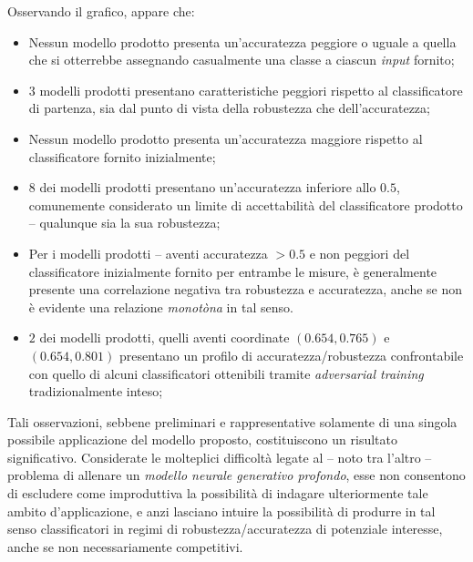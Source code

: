 \documentclass[a4paper, twoside]{article}
\begin{document}
Osservando il grafico, appare che:

\begin{itemize}
	\item {Nessun modello prodotto presenta un'accuratezza peggiore o uguale a quella che si otterrebbe assegnando casualmente una classe a ciascun \textit{input} fornito;}

	\item {$3$ modelli prodotti presentano caratteristiche peggiori rispetto al classificatore di partenza, sia dal punto di vista della robustezza che dell'accuratezza;}

	\item {Nessun modello prodotto presenta un'accuratezza maggiore rispetto al classificatore fornito inizialmente;}

	\item {8 dei modelli prodotti presentano un'accuratezza inferiore allo $0.5$, comunemente considerato un limite di accettabilità del classificatore prodotto -- qualunque sia la sua robustezza;}

	\item {Per i modelli prodotti -- aventi accuratezza $>0.5$ e non peggiori del classificatore inizialmente fornito per entrambe le misure, è generalmente presente una correlazione negativa tra robustezza e accuratezza, anche se non è evidente una relazione \textit{monotòna} in tal senso.}

	\item {$2$ dei modelli prodotti, quelli aventi coordinate $(0.654, 0.765)$ e $(0.654, 0.801)$ presentano un profilo di accuratezza/robustezza confrontabile con quello di alcuni classificatori ottenibili tramite \textit{adversarial training} tradizionalmente inteso;}

\end{itemize}


Tali osservazioni, sebbene preliminari e rappresentative solamente di una singola possibile applicazione del modello proposto, costituiscono un risultato significativo. Considerate le molteplici difficoltà legate al -- noto tra l'altro -- problema di allenare un \textit{modello neurale generativo profondo}, esse non consentono di escludere come improduttiva la possibilità di indagare ulteriormente tale ambito d'applicazione, e anzi lasciano intuire la possibilità di produrre in tal senso classificatori in regimi di robustezza/accuratezza di potenziale interesse, anche se non necessariamente competitivi.
\end{document}
